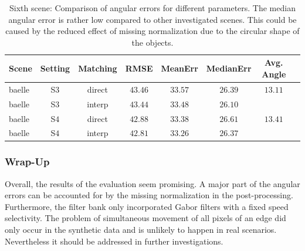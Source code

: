 \begin{table}[tb]
	\centering
		\begin{tabular}{lccccccc}
Scene & Setting & Matching & RMSE & MeanErr & MedianErr & Avg. Angle \\
\hline  \hline
baelle & S$3$ & direct & $43.46$ & $33.57$ & $26.39$ & $13.11$ & \\
baelle & S$3$ & interp & $43.44$ & $33.48$ & $26.10$ &  & \\
baelle & S$4$ & direct & $42.88$ & $33.38$ & $26.61$ & $13.41$ & \\
baelle & S$4$ & interp & $42.81$ & $33.26$ & $26.37$ &  & \\
		\end{tabular}
	\caption[Sixth scene: Comparison of angular errors for different parameters.]{Sixth scene: Comparison of angular errors for different parameters.
	The median angular error is rather low compared to other investigated scenes. 
	This could be caused by the reduced effect of missing normalization due to the circular shape of the objects.}
	\label{tab:error_comparison_baelle}
\end{table}

\subsubsection{Wrap-Up}
Overall, the results of the evaluation seem promising.
A major part of the angular errors can be accounted for by the missing normalization in the post-processing.
Furthermore, the filter bank only incorporated Gabor filters with a fixed speed selectivity.
The problem of simultaneous movement of all pixels of an edge did only occur in the synthetic data and is unlikely to happen in real scenarios.
Nevertheless it should be addressed in further investigations.
